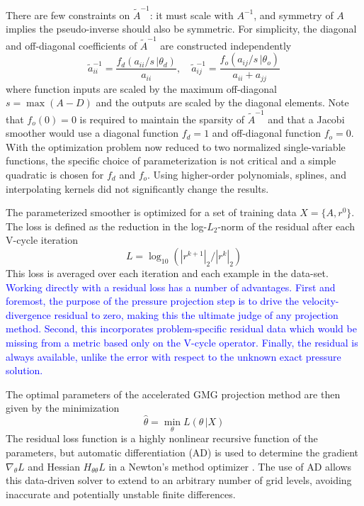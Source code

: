 \documentclass[]{elsarticle}
\begin{document}
There are few constraints on $\tilde A^{-1}$: it must scale with $A^{-1}$, and symmetry of $A$ implies the pseudo-inverse should also be symmetric. For simplicity, the diagonal and off-diagonal coefficients of $\tilde A^{-1}$ are constructed independently 
\begin{equation}\label{eq:approxinv}
    \tilde a^{-1}_{ii} = \frac{f_d(a_{ii}/s\,|\theta_d)}{a_{ii}} , \quad
    \tilde a^{-1}_{ij} = \frac{f_o(a_{ij}/s\,|\theta_o)}{a_{ii}+a_{jj}}
\end{equation}
where function inputs are scaled by the maximum off-diagonal $s=\max(A-D)$ and the outputs are scaled by the diagonal elements. Note that $f_o(0)=0$ is required to maintain the sparsity of $\tilde A^{-1}$ and that a Jacobi smoother would use a diagonal function $f_d=1$ and off-diagonal function $f_o=0$. With the optimization problem now reduced to two normalized single-variable functions, the specific choice of parameterization is not critical and a simple quadratic is chosen for $f_d$ and $f_o$. Using higher-order polynomials, splines, and interpolating kernels did not significantly change the results.

The parameterized smoother is optimized for a set of training data $X=\{A,r^0\}$. The loss is defined as the reduction in the log-$L_2$-norm of the residual after each V-cycle iteration 
\begin{equation}
L = \log_{10}(|r^{k+1}|_2 / |r^{k}|_2)
\end{equation}
This loss is averaged over each iteration and each example in the data-set. \textcolor{blue}{Working directly with a residual loss has a number of advantages. First and foremost, the purpose of the pressure projection step is to drive the velocity-divergence residual to zero, making this the ultimate judge of any projection method. Second, this incorporates problem-specific residual data which would be missing from a metric based only on the V-cycle operator. Finally, the residual is always available, unlike the error with respect to the unknown exact pressure solution.}

The optimal parameters of the accelerated GMG projection method are then given by the minimization
\begin{equation}
    \hat\theta = \min_\theta L(\theta\, |X)
\end{equation}
The residual loss function is a highly nonlinear recursive function of the parameters, but automatic differentiation (AD) is used to determine the gradient $\nabla_\theta L$ and Hessian $H_{\theta\theta} L$ in a Newton's method optimizer  \cite{mogensen2018optim,RevelsLubinPapamarkou2016}. The use of AD allows this data-driven solver to extend to an arbitrary number of grid levels, avoiding inaccurate and potentially unstable finite differences.
\end{document}
